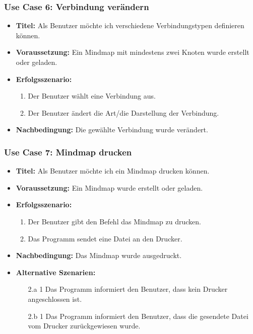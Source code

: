 \subsubsection{Use Case 6: Verbindung verändern}
\begin{itemize}
\item \textbf{Titel:} Als Benutzer möchte ich verschiedene Verbindungstypen definieren können.
\item \textbf{Voraussetzung:} Ein Mindmap mit mindestens zwei Knoten wurde erstellt oder geladen.
\item \textbf{Erfolgsszenario:}
	\begin{enumerate}
	\item Der Benutzer wählt eine Verbindung aus.
	\item Der Benutzer ändert die Art/die Darstellung der Verbindung.
	\end{enumerate}
\item \textbf{Nachbedingung:} Die gewählte Verbindung wurde verändert.
\end{itemize}

\subsubsection{Use Case 7: Mindmap drucken}
\begin{itemize}
\item \textbf{Titel:} Als Benutzer möchte ich ein Mindmap drucken können.
\item \textbf{Voraussetzung:} Ein Mindmap wurde erstellt oder geladen.
\item \textbf{Erfolgsszenario:}
	\begin{enumerate}
	\item Der Benutzer gibt den Befehl das Mindmap zu drucken.
	\item Das Programm sendet eine Datei an den Drucker.
	\end{enumerate}
\item \textbf{Nachbedingung:} Das Mindmap wurde ausgedruckt.
\item \textbf{Alternative Szenarien:}
	\begin{enumerate}
	\item [2.a 1] Das Programm informiert den Benutzer, dass kein Drucker angeschlossen ist.
	\item []
	\item [2.b 1] Das Programm informiert den Benutzer, dass die gesendete Datei vom Drucker zurückgewiesen wurde.
	\end{enumerate}
\end{itemize}

